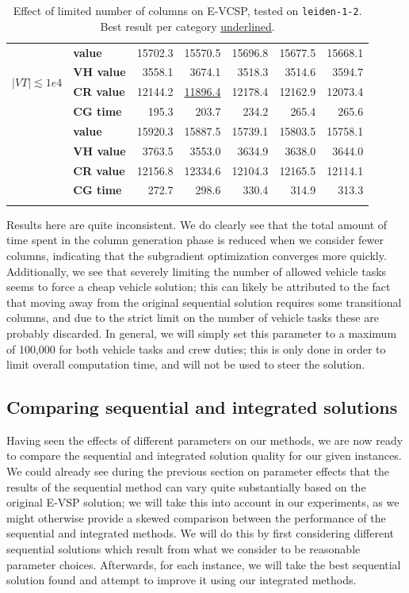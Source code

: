\documentclass[]{article}
\begin{document}
\begin{table}[h]
\begin{tabular}{llrrrrr}
    \multirow{4}{*}{$|VT| \lesssim 1e4$} & \textbf{value}  & 15702.3  & 15570.5  & 15696.8 & 15677.5 & 15668.1 \\
    & \textbf{VH value} & 3558.1 & 3674.1 & 3518.3 & 3514.6 & 3594.7 \\
    & \textbf{CR value} & 12144.2 & \underline{11896.4} & 12178.4 & 12162.9 & 12073.4 \\
    & \textbf{CG time} & 195.3 & 203.7 & 234.2 & 265.4 & 265.6 \\
    \arrayrulecolor{black!30}\cmidrule(lr){1-7}
    \multirow{4}{*}{$|VT| \lesssim 2.5e4$} & \textbf{value}  & 15920.3 & 15887.5 & 15739.1& 15803.5& 15758.1\\
    & \textbf{VH value} & 3763.5 & 3553.0 & 3634.9 & 3638.0 & 3644.0 \\
    & \textbf{CR value} & 12156.8 & 12334.6 & 12104.3 & 12165.5 & 12114.1 \\
    & \textbf{CG time} & 272.7 & 298.6 & 330.4 & 314.9 & 313.3 \\
    \arrayrulecolor{black}\bottomrule
  \end{tabular}
  \caption{Effect of limited number of columns on E-VCSP, tested on \texttt{leiden-1-2}. Best result per category \underline{underlined}.}
  \label{tab:evcsp-max-cols}
\end{table}

Results here are quite inconsistent. We do clearly see that the total amount of time spent in the column generation phase is reduced when we consider fewer columns, indicating that the subgradient optimization converges more quickly. Additionally, we see that severely limiting the number of allowed vehicle tasks seems to force a cheap vehicle solution; this can likely be attributed to the fact that moving away from the original sequential solution requires some transitional columns, and due to the strict limit on the number of vehicle tasks these are probably discarded. In general, we will simply set this parameter to a maximum of 100,000 for both vehicle tasks and crew duties; this is only done in order to limit overall computation time, and will not be used to steer the solution.

\subsection{Comparing sequential and integrated solutions}
Having seen the effects of different parameters on our methods, we are now ready to compare the sequential and integrated solution quality for our given instances. We could already see during the previous section on parameter effects that the results of the sequential method can vary quite substantially based on the original E-VSP solution; we will take this into account in our experiments, as we might otherwise provide a skewed comparison between the performance of the sequential and integrated methods. We will do this by first considering different sequential solutions which result from what we consider to be reasonable parameter choices. Afterwards, for each instance, we will take the best sequential solution found and attempt to improve it using our integrated methods. 
\end{document}
